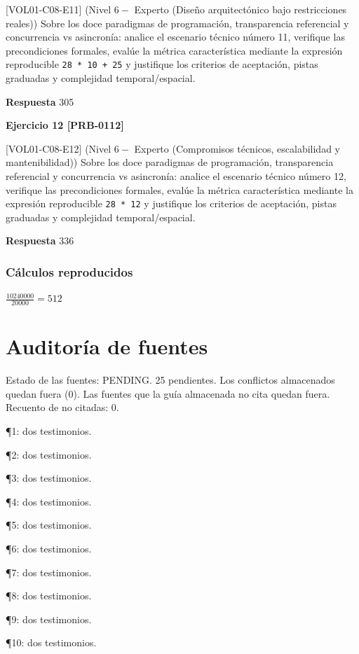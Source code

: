 \documentclass{book}
\begin{document}
[VOL01-C08-E11] (Nivel \(6 -\) Experto (Diseño arquitectónico bajo restricciones reales)) Sobre los doce paradigmas de programación, transparencia referencial y concurrencia vs asincronía: analice el escenario técnico número 11, verifique las precondiciones formales, evalúe la métrica característica mediante la expresión reproducible \texttt{28 * 10 + 25} y justifique los criterios de aceptación, pistas graduadas y complejidad temporal/espacial.

\noindent\textbf{Respuesta} 305

\noindent\textbf{Ejercicio 12 [PRB-0112]}

[VOL01-C08-E12] (Nivel \(6 -\) Experto (Compromisos técnicos, escalabilidad y mantenibilidad)) Sobre los doce paradigmas de programación, transparencia referencial y concurrencia vs asincronía: analice el escenario técnico número 12, verifique las precondiciones formales, evalúe la métrica característica mediante la expresión reproducible \texttt{28 * 12} y justifique los criterios de aceptación, pistas graduadas y complejidad temporal/espacial.

\noindent\textbf{Respuesta} 336

\subsection*{Cálculos reproducidos}

\(\frac{10240000}{20000} = 512\)
\chapter{Auditoría de fuentes}

\noindent Estado de las fuentes: PENDING. 25 pendientes. Los conflictos almacenados quedan fuera (0). Las fuentes que la guía almacenada no cita quedan fuera. Recuento de no citadas: 0.

\noindent ¶1: dos testimonios.

\noindent ¶2: dos testimonios.

\noindent ¶3: dos testimonios.

\noindent ¶4: dos testimonios.

\noindent ¶5: dos testimonios.

\noindent ¶6: dos testimonios.

\noindent ¶7: dos testimonios.

\noindent ¶8: dos testimonios.

\noindent ¶9: dos testimonios.

\noindent ¶10: dos testimonios.
\end{document}
